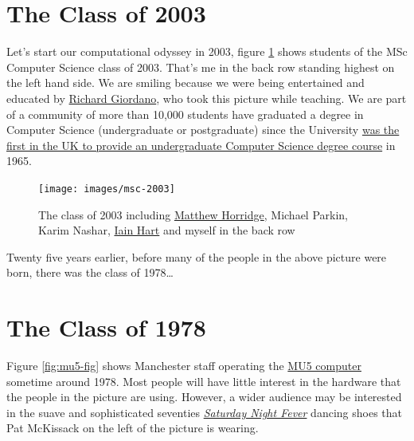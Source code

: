 \documentclass[
  12pt,
]{book}
\begin{document}
\hypertarget{y2003}{%
\section{The Class of 2003}\label{y2003}}

Let's start our computational odyssey in 2003, figure \ref{fig:msc-fig} shows students of the MSc Computer Science class of 2003. That's me in the back row standing highest on the left hand side. We are smiling because we were being entertained and educated by \href{https://www.southampton.ac.uk/healthsciences/about/staff/richard_giordano.page}{Richard Giordano}, who took this picture while teaching. We are part of a community of more than 10,000 students have graduated a degree in Computer Science (undergraduate or postgraduate) since the University \href{http://www.bbc.co.uk/manchester/content/articles/2005/11/07/baby_computer_40_interview_feature.shtml}{was the first in the UK to provide an undergraduate Computer Science degree course} in 1965. \citep{babygrowsup}

\begin{figure}

{\centering \texttt{[image: images/msc-2003]} 

}

\caption{The class of 2003 including \href{https://web.stanford.edu/~horridge/}{Matthew Horridge}, Michael Parkin, Karim Nashar, \href{https://staffnet.cs.manchester.ac.uk/techso/}{Iain Hart} and myself in the back row}\label{fig:msc-fig}
\end{figure}



Twenty five years earlier, before many of the people in the above picture were born, there was the class of 1978\ldots{}

\hypertarget{y1978}{%
\section{The Class of 1978}\label{y1978}}

Figure \ref{fig:mu5-fig} shows Manchester staff operating the \href{https://en.wikipedia.org/wiki/Manchester_computers\#MU5}{MU5 computer} sometime around 1978. Most people will have little interest in the hardware that the people in the picture are using. However, a wider audience may be interested in the suave and sophisticated seventies \emph{\href{https://en.wikipedia.org/wiki/Saturday_Night_Fever}{Saturday Night Fever}} dancing shoes that Pat McKissack on the left of the picture is wearing. \citep{nightfever}
\end{document}
